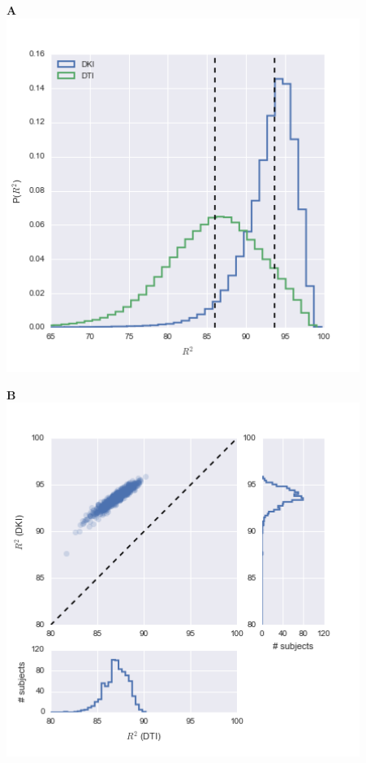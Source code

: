 \documentclass[a0, landscape]{a0poster}
\begin{document}
\begin{multicols}{3}
\begin{minipage}[b]{1\linewidth}
  \large
  \begin{minipage}[b]{0.33\linewidth}
  \textbf{A}\\
  \includegraphics[width=11.5cm]{histogram_cod_dki_dti.png}
  \end{minipage}
  \begin{minipage}[b]{0.33\linewidth}
  \textbf{B}\\
  \includegraphics[width=11.5cm]{cod_dti_dki.png}

\end{minipage}
\end{minipage}
\end{multicols}
\end{document}
